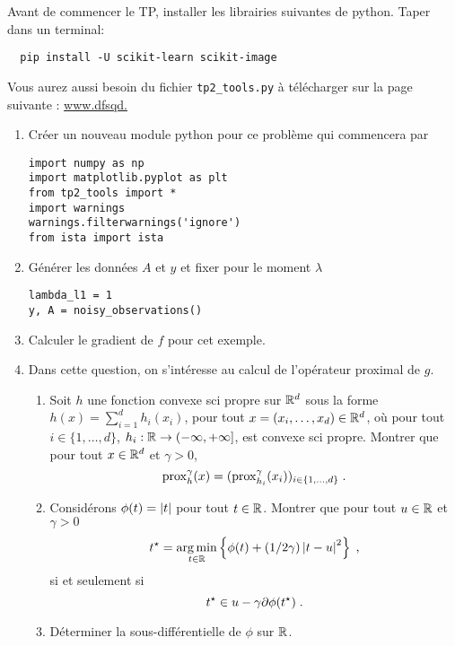 \documentclass[a4paper,french,12pt]{article}
\begin{document}
Avant de commencer le TP, installer les librairies suivantes de python. Taper dans un terminal:
\begin{lstlisting}
  pip install -U scikit-learn scikit-image
\end{lstlisting}

Vous aurez aussi besoin du fichier \lstinline+tp2_tools.py+ à télécharger sur la page suivante : \url{www.dfsqd.}

\begin{enumerate}
\item Créer un nouveau module python pour ce problème qui commencera par
\begin{lstlisting}
import numpy as np
import matplotlib.pyplot as plt
from tp2_tools import *
import warnings
warnings.filterwarnings('ignore')
from ista import ista
\end{lstlisting}
\item Générer les données $A$ et $y$ et fixer pour le moment $\lambda$
  \begin{lstlisting}
lambda_l1 = 1
y, A = noisy_observations()
  \end{lstlisting}
\item Calculer le gradient de $f$ pour cet exemple.
\item Dans cette question, on s'intéresse au calcul de l'opérateur
  proximal de $g$.
  \begin{enumerate}
  \item Soit $h$ une fonction convexe sci propre sur $\mathbb{R}^d$ sous la
    forme $h(x)= \sum_{i=1}^d h_i(x_i)$, pour tout
    $x = (x_i,\ldots,x_d)\in \mathbb{R}^d$, où pour tout
    $i \in \{1,\ldots,d\}$,
    $h_i : \mathbb{R} \to \left(-\infty,+\infty\right]$, est convexe sci
    propre. Montrer que pour tout $x \in \mathbb{R}^d$ et $\gamma >0$,
    \begin{equation*}
      \operatorname{prox}_h^{\gamma}(x) = (      \operatorname{prox}_{h_i}^{\gamma}(x_i))_{i \in \{1,\ldots,d\}} \;. 
    \end{equation*}
  \item Considérons $\phi(t) = \left\vert t \right\vert$ pour tout $t \in \mathbb{R}$.
    Montrer que pour tout $u \in \mathbb{R}$ et $\gamma >0$
    \begin{equation*}
      t^{\star} = \mathop{\mathrm{arg\,min}}_{t \in \mathbb{R}} \left\lbrace \phi(t) + (1/2\gamma) \left\vert t-u \right\vert^2 \right\rbrace \;,
    \end{equation*}
    si et seulement si
    \begin{equation*}
      t^{\star} \in u - \gamma \partial \phi(t^{\star}) \;. 
    \end{equation*}
  \item Déterminer la sous-différentielle de $\phi$ sur $\mathbb{R}$.
    

\end{enumerate}
\end{enumerate}
\end{document}
